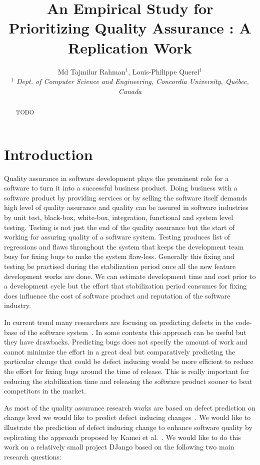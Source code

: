\documentclass[10pt, conference]{IEEEtran}
\title{An Empirical Study for Prioritizing Quality Assurance : A Replication Work}
\author{Md Tajmilur Rahman$^{1}$, Louis-Philippe Querel$^{1}$
    \\
	\emph{$^{1}$ Dept. of Computer Science and Engineering, Concordia University, Qu\'{e}bec, Canada}
}
\begin{document}
\maketitle

\begin{abstract}
TODO

\end{abstract}

\section{Introduction}
\label{sec:introduction}

Quality assurance in software development plays the prominent role for a software to turn it into a successful business product. Doing business with a software product by providing services or by selling the software itself demands high level of quality assurance and quality can be assured in software industries by unit test, black-box, white-box, integration, functional and system level testing. Testing is not just the end of the quality assurance but the start of working for assuring quality of a software system. Testing produces list of regressions and flaws throughout the system that keeps the development team busy for fixing bugs to make the system flaw-less. Generally this fixing and testing be practised during the stabilization period once all the new feature development works are done. We can estimate development time and cost prior to a development cycle but the effort that stabilization period consumes for fixing does influence the cost of software product and reputation of the software industry.

In current trend many researchers are focusing on predicting defects in the code-base of the software system~\cite{Gyimothy2005IEEE}. In some contexts this approach can be useful but they have drawbacks. Predicting bugs does not specify the amount of work and cannot minimize the effort in a great deal but comparatively predicting the particular change that could be defect inducing would be more efficient to reduce the effort for fixing bugs around the time of release. This is really important for reducing the stabilization time and releasing the software product sooner to beat competitors in the market.

As most of the quality assurance research works are based on defect prediction on change level we would like to predict defect inducing changes~\cite{Kim2008TSE}. We would like to illustrate the prediction of defect inducing change to enhance software quality by replicating the approach proposed by Kamei et al.~\cite{Kamei2013TSE}. We would like to do this work on a relatively small project DJango based on the following two main research questions:
\end{document}
